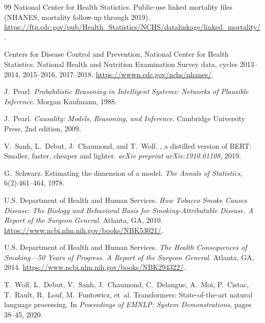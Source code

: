\documentclass[11pt,a4paper]{article}
\begin{document}
\begin{thebibliography}{99}
National Center for Health Statistics.
\newblock Public-use linked mortality files (NHANES, mortality follow-up through 2019).
\newblock \url{https://ftp.cdc.gov/pub/Health_Statistics/NCHS/datalinkage/linked_mortality/}.

Centers for Disease Control and Prevention, National Center for Health Statistics.
\newblock National Health and Nutrition Examination Survey data, cycles 2013--2014, 2015--2016, 2017--2018.
\newblock \url{https://wwwn.cdc.gov/nchs/nhanes/}.

J.~Pearl.
\newblock \emph{Probabilistic Reasoning in Intelligent Systems: Networks of Plausible Inference}.
\newblock Morgan Kaufmann, 1988.

J.~Pearl.
\newblock \emph{Causality: Models, Reasoning, and Inference}.
\newblock Cambridge University Press, 2nd edition, 2009.

V.~Sanh, L.~Debut, J.~Chaumond, and T.~Wolf.
, a distilled version of {BERT}: Smaller, faster, cheaper and lighter.
\newblock \emph{arXiv preprint arXiv:1910.01108}, 2019.

G.~Schwarz.
\newblock Estimating the dimension of a model.
\newblock \emph{The Annals of Statistics}, 6(2):461--464, 1978.

U.S. Department of Health and Human Services.
\newblock \emph{How Tobacco Smoke Causes Disease: The Biology and Behavioral Basis for Smoking-Attributable Disease. A Report of the
Surgeon General}.
\newblock Atlanta, GA, 2010. \url{https://www.ncbi.nlm.nih.gov/books/NBK53021/}.

U.S. Department of Health and Human Services.
\newblock \emph{The Health Consequences of Smoking---50 Years of Progress. A Report of the Surgeon General}.
\newblock Atlanta, GA, 2014. \url{https://www.ncbi.nlm.nih.gov/books/NBK294322/}.

T.~Wolf, L.~Debut, V.~Sanh, J.~Chaumond, C.~Delangue, A.~Moi, P.~Cistac, T.~Rault, R.~Louf, M.~Funtowicz, et~al.
\newblock Transformers: State-of-the-art natural language processing.
\newblock In \emph{Proceedings of EMNLP: System Demonstrations}, pages 38--45, 2020.

\end{thebibliography}
\end{document}
